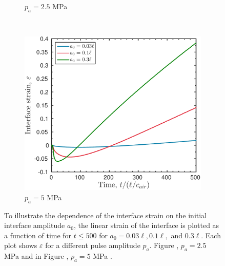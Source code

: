 \begin{figure}
\begin{subfigure}[b]{0.49\textwidth}
    \caption{\label{fig:strain_multi-a0-A25} $p_a = 2.5$ MPa}
  \end{subfigure}
  ~
  \begin{subfigure}[b]{0.49\textwidth}
    \includegraphics[width=\textwidth]{./figs/lung_figs/rmawave_1_A50_a03,10,30_strain_08-Mar-2017}
    \caption{\label{fig:strain_multi-a0-A50} $p_a = 5$ MPa}
  \end{subfigure}
  \caption{To illustrate the dependence of the interface strain on the
    initial interface amplitude $a_0$, the linear strain of the
    interface is plotted as a function of time for $t\leq500$ for
    $a_0=0.03\ell, 0.1\ell,$ and $0.3\ell$. Each plot shows $\varepsilon$
    for a different pulse amplitude $p_a$. Figure
    , $p_a = 2.5$ MPa and in Figure
    , $p_a = 5$ MPa .}
  \label{fig:a0_dependence_strain}
\end{figure}
%
%
